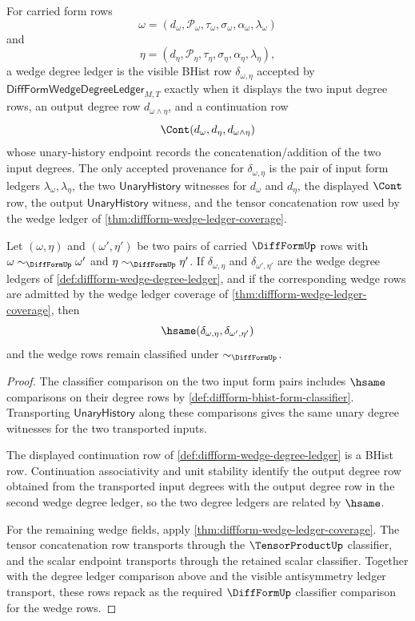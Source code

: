 \begin{definition}
\label{def:diffform-wedge-degree-ledger}
For carried form rows
$$
\omega=(d_\omega,\mathcal{P}_\omega,\tau_\omega,\sigma_\omega,\alpha_\omega,\lambda_\omega)
$$
and
$$
\eta=(d_\eta,\mathcal{P}_\eta,\tau_\eta,\sigma_\eta,\alpha_\eta,\lambda_\eta),
$$
a wedge degree ledger is the visible BHist row $\delta_{\omega,\eta}$ accepted
by $\mathsf{DiffFormWedgeDegreeLedger}_{M,T}$ exactly when it displays the two
input degree rows, an output degree row $d_{\omega\wedge\eta}$, and a
continuation row
$$
\Cont(d_\omega,d_\eta,d_{\omega\wedge\eta})
$$
whose unary-history endpoint records the concatenation/addition of the two
input degrees. The only accepted provenance for $\delta_{\omega,\eta}$ is the
pair of input form ledgers $\lambda_\omega,\lambda_\eta$, the two
$\mathsf{UnaryHistory}$ witnesses for $d_\omega$ and $d_\eta$, the displayed
$\Cont$ row, the output $\mathsf{UnaryHistory}$ witness, and the tensor
concatenation row used by the wedge ledger of
\autoref{thm:diffform-wedge-ledger-coverage}.
\end{definition}

\begin{theorem}
\label{thm:diffform-wedge-degree-classifier-stability}
Let $(\omega,\eta)$ and $(\omega',\eta')$ be two pairs of carried
$\DiffFormUp$ rows with $\omega\sim_{\DiffFormUp}\omega'$ and
$\eta\sim_{\DiffFormUp}\eta'$. If $\delta_{\omega,\eta}$ and
$\delta_{\omega',\eta'}$ are the wedge degree ledgers of
\autoref{def:diffform-wedge-degree-ledger}, and if the corresponding wedge
rows are admitted by the wedge ledger coverage of
\autoref{thm:diffform-wedge-ledger-coverage}, then
$$
\hsame(\delta_{\omega,\eta},\delta_{\omega',\eta'})
$$
and the wedge rows remain classified under $\sim_{\DiffFormUp}$.
\end{theorem}
\begin{proof}
The classifier comparison on the two input form pairs includes $\hsame$
comparisons on their degree rows by
\autoref{def:diffform-bhist-form-classifier}. Transporting
$\mathsf{UnaryHistory}$ along these comparisons gives the same unary degree
witnesses for the two transported inputs.

The displayed continuation row of
\autoref{def:diffform-wedge-degree-ledger} is a BHist row. Continuation
associativity and unit stability identify the output degree row obtained from
the transported input degrees with the output degree row in the second wedge
degree ledger, so the two degree ledgers are related by $\hsame$.

For the remaining wedge fields, apply
\autoref{thm:diffform-wedge-ledger-coverage}. The tensor concatenation row
transports through the $\TensorProductUp$ classifier, and the scalar endpoint
transports through the retained scalar classifier. Together with the degree
ledger comparison above and the visible antisymmetry ledger transport, these
rows repack as the required $\DiffFormUp$ classifier comparison for the wedge
rows.
\end{proof}

